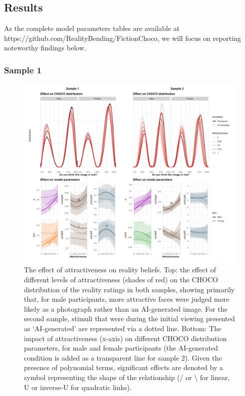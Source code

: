 \documentclass[
  jou,
  floatsintext,
  longtable,
  nolmodern,
  notxfonts,
  notimes,
  colorlinks=true,linkcolor=blue,citecolor=blue,urlcolor=blue]{apa7}
\begin{document}
\subsection{Results}\label{results-1}

As the complete model parameters tables are available at
https://github.com/RealityBending/FictionChoco, we will focus on
reporting noteworthy findings below.

\subsubsection{Sample 1}\label{sample-1}

\begin{figure}[!htbp]

{\caption{{The effect of attractiveness on reality beliefs. Top: the
effect of different levels of attractiveness (shades of red) on the
CHOCO distribution of the reality ratings in both samples, showing
primarily that, for male participants, more attractive faces were judged
more likely as a photograph rather than an AI-generated image. For the
second sample, stimuli that were during the initial viewing presented as
`AI-generated' are represented via a dotted line. Bottom: The impact of
attractiveness (x-axis) on different CHOCO distribution parameters, for
male and female participants (the AI-generated condition is added as a
transparent line for sample 2). Given the presence of polynomial terms,
significant effects are denoted by a symbol representing the shape of
the relationship (/ or \textbackslash{} for linear, U or inverse-U for
quadratic links).}{\label{fig-five}}}}

\includegraphics[width=1\linewidth,height=\textheight,keepaspectratio]{./figures/fig5.png}

\end{figure}
\end{document}
